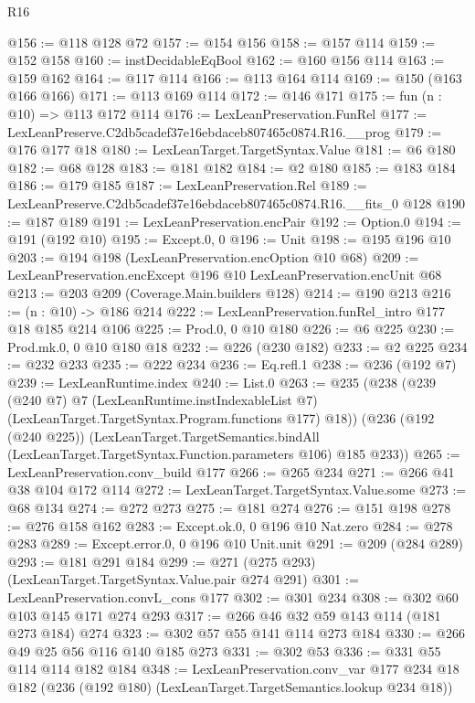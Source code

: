 \begin{lexlean}{R16}
\begin{coremodule}
@156 := @118 @128 @72
@157 := @154 @156
@158 := @157 @114
@159 := @152 @158
@160 := instDecidableEqBool
@162 := @160 @156 @114
@163 := @159 @162
@164 := @117 @114
@166 := @113 @164 @114
@169 := @150 (@163 @166 @166)
@171 := @113 @169 @114
@172 := @146 @171
@175 := fun (n : @10) => @113 @172 @114
@176 := LexLeanPreservation.FunRel
@177 := LexLeanPreserve.C2db5cadef37e16ebdaceb807465c0874.R16.__prog
@179 := @176 @177 @18
@180 := LexLeanTarget.TargetSyntax.Value
@181 := @6 @180
@182 := @68 @128
@183 := @181 @182
@184 := @2 @180
@185 := @183 @184
@186 := @179 @185
@187 := LexLeanPreservation.Rel
@189 := LexLeanPreserve.C2db5cadef37e16ebdaceb807465c0874.R16.__fits_0 @128
@190 := @187 @189
@191 := LexLeanPreservation.encPair
@192 := Option.{0}
@194 := @191 (@192 @10)
@195 := Except.{0, 0}
@196 := Unit
@198 := @195 @196 @10
@203 := @194 @198 (LexLeanPreservation.encOption @10 @68)
@209 := LexLeanPreservation.encExcept @196 @10 LexLeanPreservation.encUnit @68
@213 := @203 @209 (Coverage.Main.builders @128)
@214 := @190 @213
@216 := (n : @10) -> @186 @214
@222 := LexLeanPreservation.funRel_intro @177 @18 @185 @214 @106
@225 := Prod.{0, 0} @10 @180
@226 := @6 @225
@230 := Prod.mk.{0, 0} @10 @180 @18
@232 := @226 (@230 @182)
@233 := @2 @225
@234 := @232 @233
@235 := @222 @234
@236 := Eq.refl.{1}
@238 := @236 (@192 @7)
@239 := LexLeanRuntime.index
@240 := List.{0}
@263 := @235
    (@238
      (@239
        (@240 @7)
        @7
        (LexLeanRuntime.instIndexableList @7)
        (LexLeanTarget.TargetSyntax.Program.functions @177)
        @18))
    (@236
      (@192 (@240 @225))
      (LexLeanTarget.TargetSemantics.bindAll
        (LexLeanTarget.TargetSyntax.Function.parameters @106)
        @185
        @233))
@265 := LexLeanPreservation.conv_build @177
@266 := @265 @234
@271 := @266 @41 @38 @104 @172 @114
@272 := LexLeanTarget.TargetSyntax.Value.some
@273 := @68 @134
@274 := @272 @273
@275 := @181 @274
@276 := @151 @198
@278 := @276 @158 @162
@283 := Except.ok.{0, 0} @196 @10 Nat.zero
@284 := @278 @283
@289 := Except.error.{0, 0} @196 @10 Unit.unit
@291 := @209 (@284 @289)
@293 := @181 @291 @184
@299 := @271 (@275 @293) (LexLeanTarget.TargetSyntax.Value.pair @274 @291)
@301 := LexLeanPreservation.convL_cons @177
@302 := @301 @234
@308 := @302 @60 @103 @145 @171 @274 @293
@317 := @266 @46 @32 @59 @143 @114 (@181 @273 @184) @274
@323 := @302 @57 @55 @141 @114 @273 @184
@330 := @266 @49 @25 @56 @116 @140 @185 @273
@331 := @302 @53
@336 := @331 @55 @114 @114 @182 @184
@348 := LexLeanPreservation.conv_var
    @177
    @234
    @18
    @182
    (@236 (@192 @180) (LexLeanTarget.TargetSemantics.lookup @234 @18))

\end{coremodule}
\end{lexlean}
